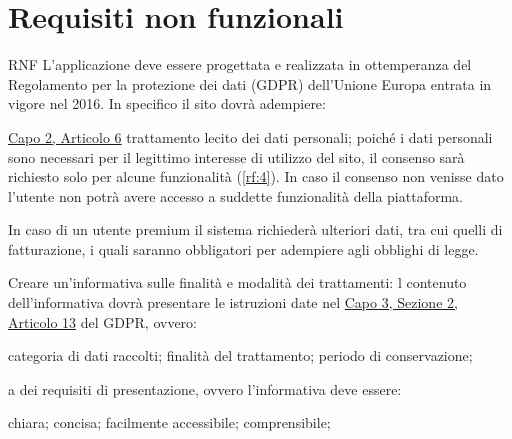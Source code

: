 \section{Requisiti non funzionali}
\label{sec:RequisitiNonFunzionali}

\begin{listaPersonale}{RNF}
     L'applicazione deve essere progettata e realizzata in ottemperanza del Regolamento per la protezione dei dati (GDPR) dell'Unione Europa entrata in vigore nel 2016. In specifico il sito dovrà adempiere:
    \begin{listaPersonale2}{}

         \href{https://eur-lex.europa.eu/legal-content/IT/TXT/?uri=uriserv:OJ.L_.2016.119.01.0001.01.ITA&toc=OJ:L:2016:119:TOC#d1e1898-1-1}{Capo 2, Articolo 6} trattamento lecito dei dati personali; poiché i dati personali sono necessari per il legittimo interesse di utilizzo del sito, il consenso sarà richiesto solo per alcune funzionalità (\ref{rf:4}). In caso il consenso non venisse dato l'utente non potrà avere accesso a suddette funzionalità della piattaforma.
        \begin{listaPersonale3}{}
             In caso di un utente premium il sistema richiederà ulteriori dati, tra cui quelli di fatturazione, i quali saranno obbligatori per adempiere agli obblighi di legge.
        \end{listaPersonale3}

         Creare un'informativa sulle finalità e modalità dei trattamenti: l contenuto dell'informativa dovrà presentare le istruzioni date nel \href{https://eur-lex.europa.eu/legal-content/IT/TXT/?uri=uriserv:OJ.L_.2016.119.01.0001.01.ITA&toc=OJ:L:2016:119:TOC#d1e2261-1-1}{Capo 3, Sezione 2, Articolo 13} del GDPR, ovvero:

        \begin{listaPersonale3}{}
             categoria di dati raccolti;
             finalità del trattamento;
             periodo di conservazione;
        \end{listaPersonale3}

         a dei requisiti di presentazione, ovvero l'informativa deve essere:
        \begin{listaPersonale3}{}
             chiara;
             concisa;
             facilmente accessibile;
             comprensibile;
        \end{listaPersonale3}


\end{listaPersonale2}
\end{listaPersonale}
